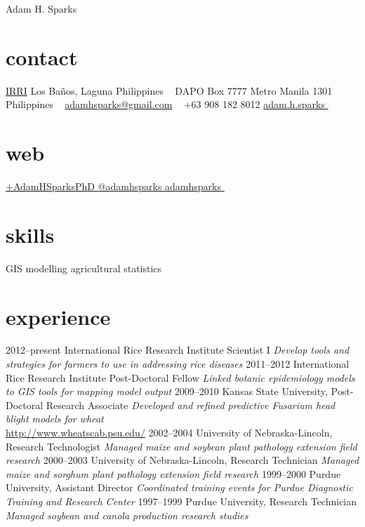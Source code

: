 
\hfill {\Huge Adam H. Sparks}

\begin{aside}
\small{\section{contact}
\href{http://www.irri.org/}{IRRI}
Los Ba\~nos, Laguna
Philippines
~
DAPO Box 7777
Metro Manila
1301 Philippines
~
\href{mailto:adamhsparks@gmail.com}{adamhsparks@gmail.com}
~
+63 908 182 8012  \faMobilePhone
{\href{skype:adam.h.sparks?call}{adam.h.sparks }}
~
\section{web}
\href{https://plus.google.com/+AdamHSparksPhD}{+AdamHSparksPhD {\color{google.plus}\faGooglePlusSign}}
\href{https://www.twitter.com/adamhsparks/}{@adamhsparks {\color{twitter.blue}\faTwitter}}
\href{https://github.com/adamhsparks/}{adamhsparks \faGithub}
~
\section{skills}
GIS
modelling
agricultural statistics}
\end{aside}

\section*{experience}
\begin{entrylist}
  \entry
    {2012--present}
    {International Rice Research Institute }
    {Scientist I}
    {\emph{Develop tools and strategies for farmers to use in addressing rice diseases}}
  \entry
    {2011--2012}
    {International Rice Research Institute }
    {Post-Doctoral Fellow}
    {\emph{Linked botanic epidemiology models to GIS tools for mapping model output}}
  \entry
    {2009--2010}
    {Kansas State University, }
    {Post-Doctoral Research Associate}
    {\emph{Developed and refined predictive Fusarium head blight models for wheat}\\
    \href{http://www.wheatscab.psu.edu/}{http://www.wheatscab.psu.edu/}}
  \entry
   {2002--2004}
   {University of Nebraska-Lincoln, }
   {Research Technologist}
   {\emph{Managed maize and soybean plant pathology extension field research}}
  \entry
   {2000--2003}
   {University of Nebraska-Lincoln, }
   {Research Technician}
   {\emph{Managed maize and sorghum plant pathology extension field research}}
  \entry
   {1999--2000}
   {Purdue University, }
   {Assistant Director}
   {\emph{Coordinated training events for Purdue Diagnostic Training and Research Center}}
  \entry
   {1997--1999}
   {Purdue University, }
   {Research Technician}
   {\emph{Managed soybean and canola production research studies}}
\end{entrylist}

